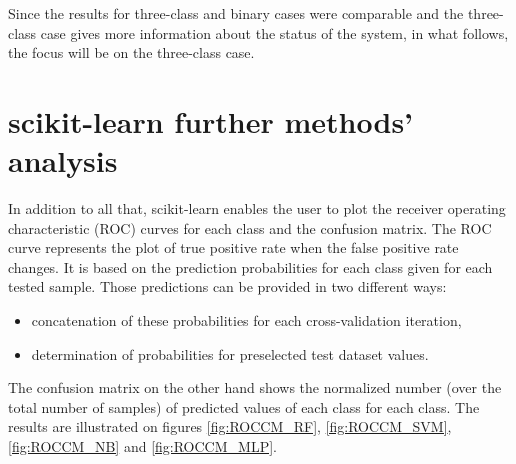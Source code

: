 Since the results for three-class and binary cases were comparable and the three-class case gives more information about the status of the system, in what follows, the focus will be on the three-class case.

\section{scikit-learn further methods' analysis}

In addition to all that, scikit-learn enables the user to plot the receiver operating characteristic (ROC) curves for each class and the confusion matrix. The ROC curve represents the plot of true positive rate when the false positive rate changes. It is based on the prediction probabilities for each class given for each tested sample. Those predictions can be provided in two different ways:
\begin{itemize}
    \item concatenation of these probabilities for each cross-validation iteration,
    \item determination of probabilities for preselected test dataset values.
\end{itemize} 
The confusion matrix on the other hand shows the normalized number (over the total number of samples) of predicted values of each class for each class. The results are illustrated on figures \ref{fig:ROCCM_RF}, \ref{fig:ROCCM_SVM}, \ref{fig:ROCCM_NB} and \ref{fig:ROCCM_MLP}.

